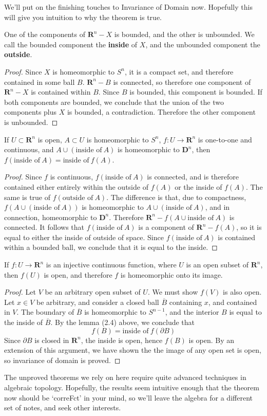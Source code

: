 We'll put on the finishing touches to Invariance of Domain now. Hopefully this will give you intuition to why the theorem is true.

\begin{lemma}
    One of the components of $\mathbf{R}^n - X$ is bounded, and the other is unbounded. We call the bounded component the {\bf inside} of $X$, and the unbounded component the {\bf outside}.
\end{lemma}
\begin{proof}
    Since $X$ is homeomorphic to $S^n$, it is a compact set, and therefore contained in some ball $B$. $\mathbf{R}^n - B$ is connected, so therefore one component of $\mathbf{R}^n - X$ is contained within $B$. Since $B$ is bounded, this component is bounded. If both components are bounded, we conclude that the union of the two components plus $X$ is bounded, a contradiction. Therefore the other component is unbounded.
\end{proof}

\begin{lemma}
    If $U \subset \mathbf{R}^n$ is open, $A \subset U$ is homeomorphic to $S^n$, $f:U \to \mathbf{R}^n$ is one-to-one and continuous, and $A \cup (\text{inside of}\ A)$ is homeomorphic to $\mathbf{D}^n$, then $f(\text{inside of}\ A) = \text{inside of}\ f(A)$.
\end{lemma}
\begin{proof}
    Since $f$ is continuous, $f(\text{inside of}\ A)$ is connected, and is therefore contained either entirely within the outside of $f(A)$ or the inside of $f(A)$. The same is true of $f(\text{outside of}\ A)$. The difference is that, due to compactness, $f(A \cup (\text{inside of}\ A))$ is homeomorphic to $A \cup (\text{inside of}\ A)$, and in connection, homeomorphic to $\mathbf{D}^n$. Therefore $\mathbf{R}^n - f(A \cup \text{inside of}\ A)$ is connected. It follows that $f(\text{inside of}\ A)$ is a component of $\mathbf{R}^n - f(A)$, so it is equal to either the inside of outside of space. Since $f(\text{inside of}\ A)$ is contained within a bounded ball, we conclude that it is equal to the inside.
\end{proof}

\begin{theorem}
    If $f:U \to \mathbf{R}^n$ is an injective continuous function, where $U$ is an open subset of $\mathbf{R}^n$, then $f(U)$ is open, and therefore $f$ is homeomorphic onto its image.
\end{theorem}
\begin{proof}
    Let $V$ be an arbitrary open subset of $U$. We must show $f(V)$ is also open. Let $x \in V$ be arbitrary, and consider a closed ball $\overline{B}$ containing $x$, and contained in $V$. The boundary of $\overline{B}$ is homeomorphic to $S^{n-1}$, and the interior $B$ is equal to the inside of $\overline{B}$. By the lemma (2.4) above, we conclude that
    \[ f(B) = \text{inside of}\ f(\partial B) \]
    Since $\partial B$ is closed in $\mathbf{R}^n$, the inside is open, hence $f(B)$ is open. By an extension of this argument, we have shown the the image of any open set is open, so invariance of domain is proved.
\end{proof}

The unproved theorems we rely on here require quite advanced techniques in algebraic topology. Hopefully, the results seem intuitive enough that the theorem now should be `correFct' in your mind, so we'll leave the algebra for a different set of notes, and seek other interests.